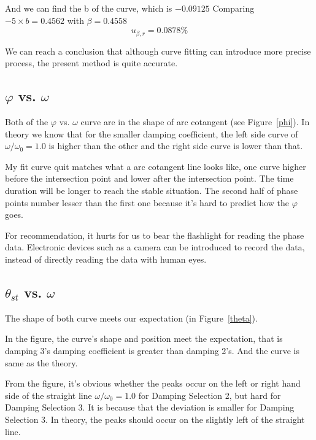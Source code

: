 And we can find the b of the curve, which is $-0.09125$
Comparing $- 5\times b =  0.4562 $ with $\beta = 0.4558$
$$ u_{\beta,r}=  0.0878 \% $$

We can reach a conclusion that although curve fitting can introduce more precise
process, the present method is quite accurate.



\subsection{$\varphi$ vs. $\omega$}

Both of the $\varphi$ vs. $\omega$ curve are in the shape of arc
cotangent (see Figure~\ref{phi}).
In theory we know that for the smaller damping coefficient, the left side curve
of $\omega/\omega_0=1.0$ is higher than the other and the right side curve is
lower than that. 

My fit curve quit matches what a arc cotangent line looks like, one curve higher
before the intersection point and lower after the intersection point.
The time duration will be longer to reach the stable situation. 
The second half of phase points number lesser than the first one because it's
hard to predict how the $\varphi$ goes. 

For recommendation, it hurts for us to bear the flashlight for reading the phase
data. 
Electronic devices such as a camera can be introduced to record the data,
instead of directly reading the data with human eyes.

\subsection{$\theta_{st}$ vs. $\omega$}

The shape of both curve meets our expectation (in Figure~\ref{theta}).

In the figure, the curve's shape and position meet the expectation, that is
damping 3's damping coefficient is greater than damping 2's.
And the curve is same as the theory.

From the figure, it's obvious whether the peaks occur on the left or right hand
side of the straight line $\omega/\omega_0=1.0$ for Damping Selection 2, but
hard for Damping Selection 3.
It is because that the deviation is smaller for Damping Selection 3.
In theory, the peaks should occur on the slightly left of the straight
line. 
